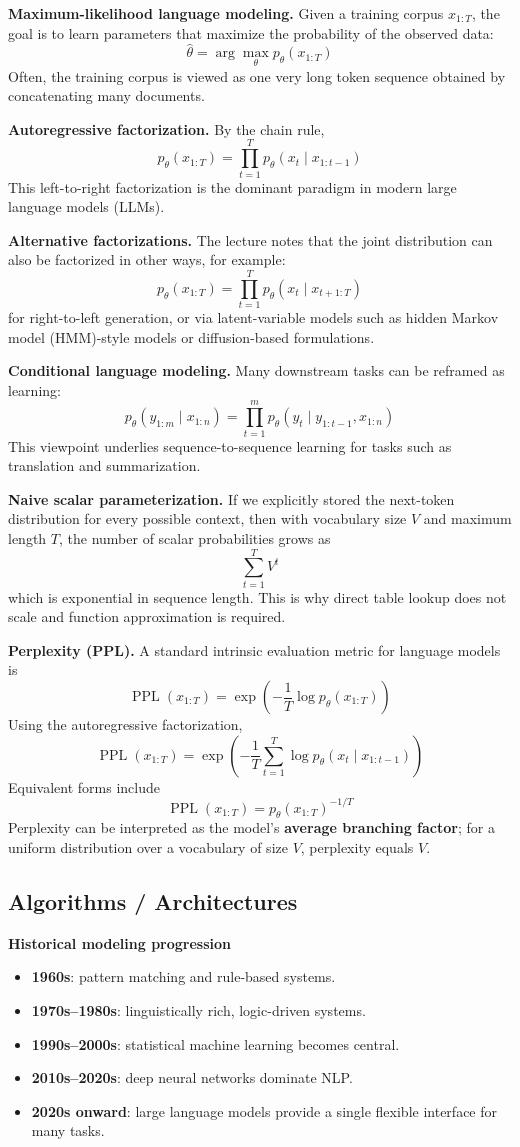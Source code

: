 \documentclass[11pt]{article}
\begin{document}
\textbf{Maximum-likelihood language modeling.} Given a training corpus \(x_{1:T}\), the goal is to learn parameters that maximize the probability of the observed data:
\[
\hat{\theta} = \arg\max_{\theta} p_\theta(x_{1:T})
\]
Often, the training corpus is viewed as one very long token sequence obtained by concatenating many documents.

\textbf{Autoregressive factorization.} By the chain rule,
\[
p_\theta(x_{1:T}) = \prod_{t=1}^{T} p_\theta(x_t \mid x_{1:t-1})
\]
This left-to-right factorization is the dominant paradigm in modern large language models (LLMs).

\textbf{Alternative factorizations.} The lecture notes that the joint distribution can also be factorized in other ways, for example:
\[
p_\theta(x_{1:T}) = \prod_{t=1}^{T} p_\theta(x_t \mid x_{t+1:T})
\]
for right-to-left generation, or via latent-variable models such as hidden Markov model (HMM)-style models or diffusion-based formulations.

\textbf{Conditional language modeling.} Many downstream tasks can be reframed as learning:
\[
p_\theta(y_{1:m} \mid x_{1:n}) = \prod_{t=1}^{m} p_\theta(y_t \mid y_{1:t-1}, x_{1:n})
\]
This viewpoint underlies sequence-to-sequence learning for tasks such as translation and summarization.

\textbf{Naive scalar parameterization.} If we explicitly stored the next-token distribution for every possible context, then with vocabulary size \(V\) and maximum length \(T\), the number of scalar probabilities grows as
\[
\sum_{t=1}^{T} V^t
\]
which is exponential in sequence length. This is why direct table lookup does not scale and function approximation is required.

\textbf{Perplexity (PPL).} A standard intrinsic evaluation metric for language models is
\[
\operatorname{PPL}(x_{1:T}) = \exp\left(-\frac{1}{T}\log p_\theta(x_{1:T})\right)
\]
Using the autoregressive factorization,
\[
\operatorname{PPL}(x_{1:T}) = \exp\left(-\frac{1}{T}\sum_{t=1}^{T}\log p_\theta(x_t \mid x_{1:t-1})\right)
\]
Equivalent forms include
\[
\operatorname{PPL}(x_{1:T}) = p_\theta(x_{1:T})^{-1/T}
\]
Perplexity can be interpreted as the model's \textbf{average branching factor}; for a uniform distribution over a vocabulary of size \(V\), perplexity equals \(V\).

\subsection{Algorithms / Architectures}
\textbf{Historical modeling progression}
\begin{itemize}
    \item \textbf{1960s}: pattern matching and rule-based systems.
    \item \textbf{1970s--1980s}: linguistically rich, logic-driven systems.
    \item \textbf{1990s--2000s}: statistical machine learning becomes central.
    \item \textbf{2010s--2020s}: deep neural networks dominate NLP.
    \item \textbf{2020s onward}: large language models provide a single flexible interface for many tasks.
\end{itemize}
\end{document}
